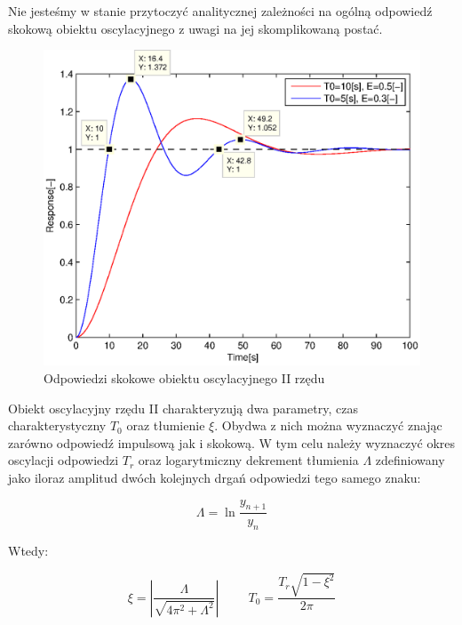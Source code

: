 \documentclass[12pt]{article}
\begin{document}
Nie jesteśmy w stanie przytoczyć analitycznej zależności na ogólną odpowiedź
skokową obiektu oscylacyjnego z uwagi na jej skomplikowaną postać.

\begin{figure}[!htb]
	\begin{center}
		\includegraphics[width=14cm]{../res/img/step3.eps}
	\end{center}
	\caption{Odpowiedzi skokowe obiektu oscylacyjnego II rzędu}
\end{figure}

Obiekt oscylacyjny rzędu II charakteryzują dwa parametry, czas charakterystyczny
$T_0$ oraz tłumienie $\xi$. Obydwa z nich można wyznaczyć znając zarówno
odpowiedź impulsową jak i skokową. W tym celu należy wyznaczyć okres oscylacji
odpowiedzi $T_r$ oraz logarytmiczny dekrement tłumienia $\Lambda$ zdefiniowany
jako iloraz amplitud dwóch kolejnych drgań odpowiedzi tego samego znaku:

\begin{equation*}
	\Lambda = \ln{\frac{y_{n+1}}{y_{n}}}
\end{equation*}

Wtedy:

\begin{equation*}
	\xi = \left|\frac{\Lambda}{\sqrt{4\pi^2+\Lambda^2}}\right| \hspace{1cm}
	T_0 = \frac{T_r\sqrt{1-\xi^2}}{2\pi}
\end{equation*}

\newpage
\end{document}
